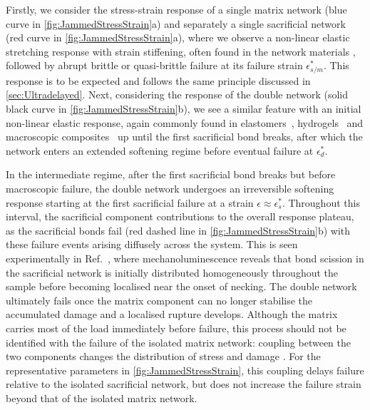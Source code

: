 Firstly, we consider the stress-strain response of a single matrix network (blue curve in \cref{fig:JammedStressStrain}a) and separately a single sacrificial network (red curve in \cref{fig:JammedStressStrain}a), where we observe a non-linear elastic stretching response with strain stiffening, often found in the network materials \cite{feng_nonlinear_2016,licup_nonlinear_2016,storm_nonlinear_2005}, followed by abrupt brittle or quasi-brittle failure \cite{dussi_athermal_2020, tauber_stretchy_2022} at its failure strain $\epsilon^*_{s/m}$. This response is to be expected and follows the same principle discussed in \cref{sec:Ultradelayed}. Next, considering the response of the double network (solid black curve in \cref{fig:JammedStressStrain}b), we see a similar feature with an initial non-linear elastic response, again commonly found in elastomers~\cite{millereauMechanicsElastomericMolecular2018, ducrot_toughening_2014}, hydrogels~\cite{gong_why_2010} and macroscopic composites~\cite{kingMacroscaleDoubleNetworks2019, takahashiCreatingStiffTough2018} up until the first sacrificial bond breaks, after which the network enters an extended softening regime before eventual failure at $\epsilon^*_d$. 

In the intermediate regime, after the first sacrificial bond breaks but before macroscopic failure, the double network undergoes an irreversible softening response starting at the first sacrificial failure at a strain $\epsilon \approx \epsilon^*_{s}$. Throughout this interval, the sacrificial component contributions to the overall response plateau, as the sacrificial bonds fail (red dashed line in \cref{fig:JammedStressStrain}b) with these failure events arising diffusely across the system. This is seen experimentally in Ref.~\cite{millereauMechanicsElastomericMolecular2018}, where mechanoluminescence reveals that bond scission in the sacrificial network is initially distributed homogeneously throughout the sample before becoming localised near the onset of necking. The double network ultimately fails once the matrix component can no longer stabilise the accumulated damage and a localised rupture develops. Although the matrix carries most of the load immediately before failure, this process should not be identified with the failure of the isolated matrix network: coupling between the two components changes the distribution of stress and damage \cite{ducrot_structure_2015,tominaga_molecular_2007,huang_importance_2007}. For the representative parameters in \cref{fig:JammedStressStrain}, this coupling delays failure relative to the isolated sacrificial network, but does not increase the failure strain beyond that of the isolated matrix network.

